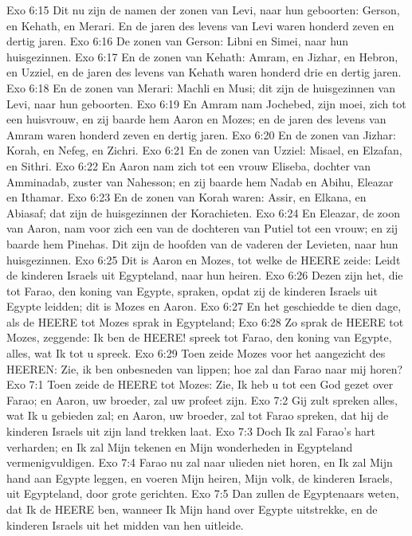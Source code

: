 Exo 6:15  Dit nu zijn de namen der zonen van Levi, naar hun geboorten: Gerson, en Kehath, en Merari. En de jaren des levens van Levi waren honderd zeven en dertig jaren.
Exo 6:16  De zonen van Gerson: Libni en Simei, naar hun huisgezinnen.
Exo 6:17  En de zonen van Kehath: Amram, en Jizhar, en Hebron, en Uzziel, en de jaren des levens van Kehath waren honderd drie en dertig jaren.
Exo 6:18  En de zonen van Merari: Machli en Musi; dit zijn de huisgezinnen van Levi, naar hun geboorten.
Exo 6:19  En Amram nam Jochebed, zijn moei, zich tot een huisvrouw, en zij baarde hem Aaron en Mozes; en de jaren des levens van Amram waren honderd zeven en dertig jaren.
Exo 6:20  En de zonen van Jizhar: Korah, en Nefeg, en Zichri.
Exo 6:21  En de zonen van Uzziel: Misael, en Elzafan, en Sithri.
Exo 6:22  En Aaron nam zich tot een vrouw Eliseba, dochter van Amminadab, zuster van Nahesson; en zij baarde hem Nadab en Abihu, Eleazar en Ithamar.
Exo 6:23  En de zonen van Korah waren: Assir, en Elkana, en Abiasaf; dat zijn de huisgezinnen der Korachieten.
Exo 6:24  En Eleazar, de zoon van Aaron, nam voor zich een van de dochteren van Putiel tot een vrouw; en zij baarde hem Pinehas. Dit zijn de hoofden van de vaderen der Levieten, naar hun huisgezinnen.
Exo 6:25  Dit is Aaron en Mozes, tot welke de HEERE zeide: Leidt de kinderen Israels uit Egypteland, naar hun heiren.
Exo 6:26  Dezen zijn het, die tot Farao, den koning van Egypte, spraken, opdat zij de kinderen Israels uit Egypte leidden; dit is Mozes en Aaron.
Exo 6:27  En het geschiedde te dien dage, als de HEERE tot Mozes sprak in Egypteland;
Exo 6:28  Zo sprak de HEERE tot Mozes, zeggende: Ik ben de HEERE! spreek tot Farao, den koning van Egypte, alles, wat Ik tot u spreek.
Exo 6:29  Toen zeide Mozes voor het aangezicht des HEEREN: Zie, ik ben onbesneden van lippen; hoe zal dan Farao naar mij horen?
Exo 7:1  Toen zeide de HEERE tot Mozes: Zie, Ik heb u tot een God gezet over Farao; en Aaron, uw broeder, zal uw profeet zijn.
Exo 7:2  Gij zult spreken alles, wat Ik u gebieden zal; en Aaron, uw broeder, zal tot Farao spreken, dat hij de kinderen Israels uit zijn land trekken laat.
Exo 7:3  Doch Ik zal Farao's hart verharden; en Ik zal Mijn tekenen en Mijn wonderheden in Egypteland vermenigvuldigen.
Exo 7:4  Farao nu zal naar ulieden niet horen, en Ik zal Mijn hand aan Egypte leggen, en voeren Mijn heiren, Mijn volk, de kinderen Israels, uit Egypteland, door grote gerichten.
Exo 7:5  Dan zullen de Egyptenaars weten, dat Ik de HEERE ben, wanneer Ik Mijn hand over Egypte uitstrekke, en de kinderen Israels uit het midden van hen uitleide.
